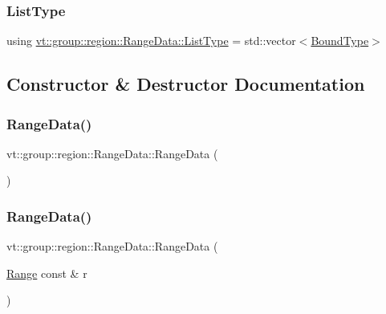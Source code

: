 \subsubsection{\texorpdfstring{List\+Type}{ListType}}
{\footnotesize\ttfamily using \hyperlink{structvt_1_1group_1_1region_1_1_range_data_a2450bd305df0f74edca0a864a3d21017}{vt\+::group\+::region\+::\+Range\+Data\+::\+List\+Type} =  std\+::vector$<$\hyperlink{structvt_1_1group_1_1region_1_1_range_data_a12ca75365c79bece7d169149b354011d}{Bound\+Type}$>$}



\subsection{Constructor \& Destructor Documentation}
\mbox{\label{structvt_1_1group_1_1region_1_1_range_data_a8b5df2211262d2886fa3a1dbc915cbe3}} 
\subsubsection{\texorpdfstring{Range\+Data()}{RangeData()}\hspace{0.1cm}{\footnotesize\ttfamily [1/2]}}
{\footnotesize\ttfamily vt\+::group\+::region\+::\+Range\+Data\+::\+Range\+Data (\begin{DoxyParamCaption}{ }\end{DoxyParamCaption})\hspace{0.3cm}{\ttfamily [default]}}

\mbox{\label{structvt_1_1group_1_1region_1_1_range_data_a9b05605529f68b98c51a425921e038cd}} 
\subsubsection{\texorpdfstring{Range\+Data()}{RangeData()}\hspace{0.1cm}{\footnotesize\ttfamily [2/2]}}
{\footnotesize\ttfamily vt\+::group\+::region\+::\+Range\+Data\+::\+Range\+Data (\begin{DoxyParamCaption}\item[{\hyperlink{structvt_1_1group_1_1region_1_1_range}{Range} const \&}]{r }\end{DoxyParamCaption})\hspace{0.3cm}{\ttfamily [inline]}}



